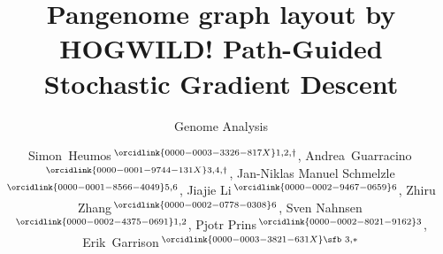 \documentclass{bioinfo}
\theoremstyle{definition}
\begin{document}

    \subtitle{Genome Analysis}

    \title[Pangenome graph layout by HOGWILD! Path-Guided Stochastic Gradient Descent]{Pangenome graph layout by HOGWILD! Path-Guided Stochastic Gradient Descent}
    \author[Heumos, Guarracino \textit{et~al}.]{
        Simon~Heumos\,$^{\orcidlink{0000-0003-3326-817X}1,2,\dagger}$,
        Andrea~Guarracino\,$^{\orcidlink{0000-0001-9744-131X}3,4,\dagger}$,
        Jan-Niklas Manuel Schmelzle\,$^{\orcidlink{0000-0001-8566-4049}5,6}$,
        Jiajie Li\,$^{\orcidlink{0000-0002-9467-0659}6}$,
        Zhiru Zhang\,$^{\orcidlink{0000-0002-0778-0308}6}$,
        Sven Nahnsen\,$^{\orcidlink{0000-0002-4375-0691}1,2}$,
        Pjotr Prins\,$^{\orcidlink{0000-0002-8021-9162}3}$,
        Erik~Garrison\,$^{\orcidlink{0000-0003-3821-631X}\text{\sfb 3},*}$
    }

    \address{
        $^1$Quantitative Biology Center (QBiC), University of Tübingen, Tübingen 72076, Germany \\
        $^2$Biomedical Data Science, Department of Computer Science, University of Tübingen, Tübingen 72076, Germany \\
        $^3$Department of Genetics, Genomics and Informatics, University of Tennessee Health Science Center, Memphis, TN 38163, USA \\
        $^4$Genomics Research Centre, Human Technopole, Milan 20157, Italy \\
        $^5$Department of Computer Engineering, School of Computation, Information and Technology (CIT), Technical University of Munich, Munich 80333, Germany \\
        $^6$School of Electrical and Computer Engineering, Cornell University, Ithaca, NY 14853, USA \\
    }



\end{document}
